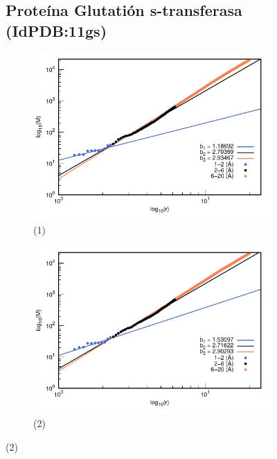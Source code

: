 \begin{figure}[H]
	\subsection*{Proteína Glutati\'{o}n s-transferasa (IdPDB:11gs)}
	
	\hspace{-0.3cm} 
	\begin{subfigure}{0.49\textwidth}
		\centering
		\includegraphics[width=\linewidth,page=1]{graphs/PDBs/11gs/11gsaddH.pdf}
		\caption{(1)}
	\end{subfigure}
	\hspace{0.2cm}
	\begin{subfigure}{0.49\textwidth}
		\centering
		\includegraphics[width=\linewidth,page=1]{graphs/PDBs/11gs/11gsEm.pdf}
		\caption{(2)}
	\end{subfigure}
	

\end{figure}
